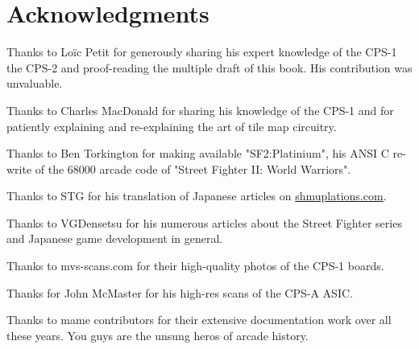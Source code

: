 \chapter{Acknowledgments} 

Thanks to Lo\"{i}c Petit for generously sharing his expert knowledge of the CPS-1 the CPS-2 and proof-reading the multiple draft of this book. His contribution was unvaluable.

Thanks to Charles MacDonald for sharing his knowledge of the CPS-1 and for patiently explaining and re-explaining the art of tile map circuitry.

Thanks to Ben Torkington for making available "SF2:Platinium", his ANSI C re-write of the 68000 arcade code of "Street Fighter II: World Warriors".

Thanks to STG for his translation of Japanese articles on \href{https://shmuplations.com}{shmuplations.com}.

Thanks to VGDensetsu for his numerous articles about the Street Fighter series and Japanese game development in general.

Thanks to mvs-scans.com for their high-quality photos of the CPS-1 boards.

Thanks for John McMaster for his high-res scans of the CPS-A ASIC.

Thanks to mame contributors for their extensive documentation work over all these years. You guys are the unsung heros of arcade history.